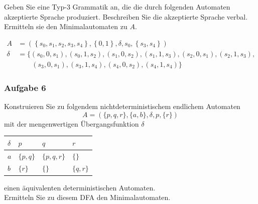\documentclass[a4paper,14pt,ngerman]{scrartcl}
\begin{document}
Geben Sie eine Typ-3 Grammatik an, die die durch folgenden Automaten
akzeptierte Sprache produziert. Beschreiben Sie die akzeptierte Sprache
verbal. Ermitteln sie den Minimalautomaten zu \(A\).

\[\begin{aligned}
        A&=\left(\left\{s_0,s_1,s_2,s_3,s_4\right\},\left\{0,1\right\},\delta,s_0,\left\{s_3,s_4\right\}\right)\\
        \delta &=\{(s_0,0,s_1),(s_0,1,s_2),(s_1,0,s_2),(s_1,1,s_3),(s_2,0,s_1),(s_2,1,s_3),\\
        &\qquad(s_3,0,s_1),(s_3,1,s_4),(s_4,0,s_2),(s_4,1,s_4)\}
\end{aligned}\]
\subsubsection{\textbf{Aufgabe 6}}
\label{sec:orgbddc5c0}

Konstruieren Sie zu folgendem nichtdeterministischem endlichem Automaten
\[A=(\{p,q,r\}, \{a,b\}, \delta, p, \{r\})\] mit der mengenwertigen Übergangsfunktion \(\delta\)

\begin{center}
\begin{center}
\begin{tabular}{llll}
\(\delta\) & \(p\) & \(q\) & \(r\)\\
\hline
\(a\) & \(\{p,q\}\) & \(\{p,q,r\}\) & \(\{\}\)\\
\(b\) & \(\{r\}\) & \(\{\}\) & \(\{q,r\}\)\\
\end{tabular}
\end{center}
\end{center}

einen äquivalenten deterministischen Automaten.\\
Ermitteln Sie zu diesem DFA den Minimalautomaten.
\end{document}
